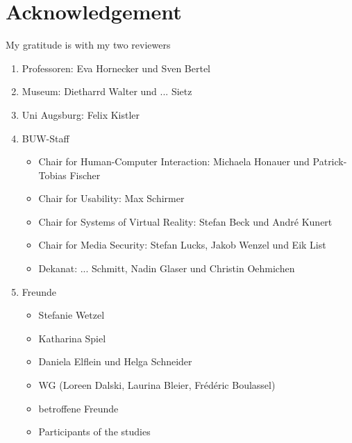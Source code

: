 \chapter*{Acknowledgement}

My gratitude is with my two reviewers  

\begin{enumerate}
	\item Professoren: Eva Hornecker und Sven Bertel
	\item Museum: Dietharrd Walter und ... Sietz
	\item Uni Augsburg: Felix Kistler
	\item BUW-Staff
	\begin{itemize}
		\item Chair for Human-Computer Interaction: Michaela Honauer und Patrick-Tobias Fischer
		\item Chair for Usability: Max Schirmer
		\item Chair for Systems of Virtual Reality: Stefan Beck und André Kunert
		\item Chair for Media Security: Stefan Lucks, Jakob Wenzel und Eik List
		\item Dekanat: ... Schmitt, Nadin Glaser und Christin Oehmichen
	\end{itemize}
	\item Freunde
	\begin{itemize}
		\item Stefanie Wetzel
		\item Katharina Spiel
		\item Daniela Elflein und Helga Schneider 
		\item WG (Loreen Dalski, Laurina Bleier, Frédéric Boulassel)
		\item betroffene Freunde
		\item Participants of the studies
	\end{itemize}
\end{enumerate}



